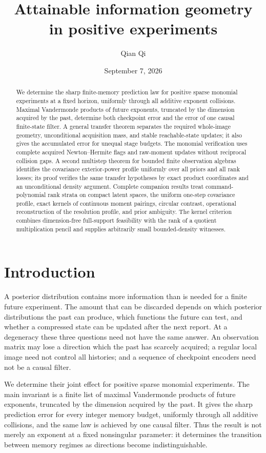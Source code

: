 \documentclass[11pt]{amsart}
\title[Attainable information geometry]{Attainable information geometry\\ in positive experiments}
\author{Qian Qi}
\date{September 7, 2026}
\theoremstyle{definition}\newtheorem{definition}[theorem]{Definition}
\theoremstyle{remark}\newtheorem{remark}[theorem]{Remark}
\begin{document}
\begin{abstract}
We determine the sharp finite-memory prediction law for positive sparse
monomial experiments at a fixed horizon, uniformly through all additive
exponent collisions. Maximal Vandermonde products of future exponents,
truncated by the dimension acquired by the past, determine both
checkpoint error and the error of one causal finite-state filter.
A general transfer theorem separates the required whole-image geometry,
unconditional acquisition mass, and stable reachable-state updates; it
also gives the accumulated error for unequal stage budgets. The monomial
verification uses complete acquired Newton--Hermite flags and raw-moment
updates without reciprocal collision gaps. A second multistep theorem
for bounded finite observation algebras identifies the covariance
exterior-power profile uniformly over all priors and all rank losses;
its proof verifies the same transfer hypotheses by exact product
coordinates and an unconditional density argument. Complete companion results
treat command-polynomial rank strata on compact latent spaces, the
uniform one-step covariance profile, exact kernels of continuous moment
pairings, circular contrast, operational reconstruction of the resolution
profile, and prior ambiguity. The kernel criterion combines dimension-free
full-support feasibility with the rank of a quotient multiplication
pencil and supplies arbitrarily small bounded-density witnesses.
\end{abstract}
\maketitle
\section{Introduction}
A posterior distribution contains more information than is needed for a
finite future experiment. The amount that can be discarded depends on
which posterior distributions the past can produce, which functions the
future can test, and whether a compressed state can be updated after the
next report. At a degeneracy these three questions need not have the
same answer. An observation matrix may lose a direction which the past
has scarcely acquired; a regular local image need not control all
histories; and a sequence of checkpoint encoders need not be a causal
filter.

We determine their joint effect for positive sparse monomial experiments.
The main invariant is a finite list of maximal Vandermonde products of
future exponents, truncated by the dimension acquired by the past. It
gives the sharp prediction error for every integer memory budget,
uniformly through all additive collisions, and the same law is achieved
by one causal filter. Thus the result is not merely an exponent at a
fixed nonsingular parameter: it determines the transition between
memory regimes as directions become indistinguishable.
\end{document}
